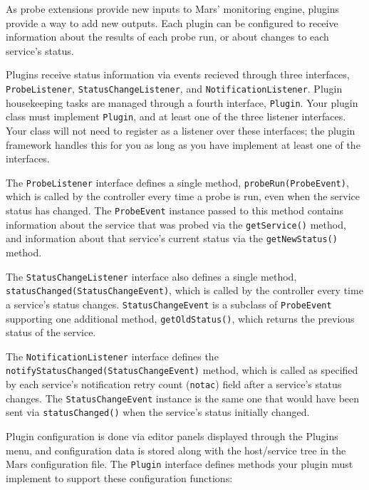 \documentclass{article}
\newcommand{\identifier}[1]{{\tt #1}}
\newcommand{\guiitem}[1]{{\sf #1}}
\begin{document}
As probe extensions provide new inputs to Mars' monitoring engine, plugins
provide a way to add new outputs. Each plugin can be configured to receive
information about the results of each probe run, or about changes to each
service's status. 

Plugins receive status information via events recieved through three
interfaces, \identifier{ProbeListener},
\identifier{StatusChangeListener}, and
\identifier{NotificationListener}.  Plugin housekeeping tasks are
managed through a fourth interface, \identifier{Plugin}. Your plugin
class must implement \identifier{Plugin}, and at least one of the
three listener interfaces. Your class will not need to register as a
listener over these interfaces; the plugin framework handles this for
you as long as you have implement at least one of the interfaces.

The \identifier{ProbeListener} interface defines a single method,
\identifier{probeRun(ProbeEvent)}, which is called by the controller
every time a probe is run, even when the service status has
changed. The \identifier{ProbeEvent} instance passed to this method
contains information about the service that was probed via the
\identifier{getService()} method, and information about that service's
current status via the \identifier{getNewStatus()} method.

The \identifier{StatusChangeListener} interface also defines a single
method, \identifier{statusChanged(StatusChangeEvent)}, which is called
by the controller every time a service's status changes.
\identifier{StatusChangeEvent} is a subclass of
\identifier{ProbeEvent} supporting one additional method,
\identifier{getOldStatus()}, which returns the previous status of the
service.

The \identifier{NotificationListener} interface defines the
\identifier{notifyStatusChanged(StatusChangeEvent)} method, which is
called as specified by each service's notification retry count
(\identifier{notac}) field after a service's status changes. The
\identifier{StatusChangeEvent} instance is the same one that would
have been sent via \identifier{statusChanged()} when the service's
status initially changed.

Plugin configuration is done via editor panels displayed through the
\guiitem{Plugins} menu, and configuration data is stored
along with the host/service tree in the Mars configuration file. The
\identifier{Plugin} interface defines methods your plugin must implement to
support these configuration functions:
\end{document}
